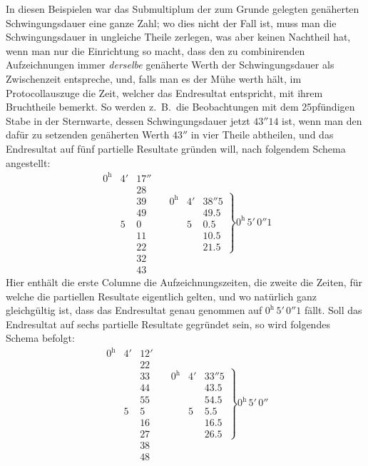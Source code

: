 In diesen Beispielen war das Submultiplum der zum Grunde gelegten genäherten Schwingungsdauer eine ganze Zahl; wo dies nicht der Fall ist, muss man die Schwingungsdauer in ungleiche Theile zerlegen, was aber keinen Nachtheil hat, wenn man nur die Einrichtung so macht, dass den zu combinirenden Aufzeichnungen immer \textit{derselbe} genäherte Werth der Schwingungsdauer als Zwischenzeit entspreche, und, falls man es der Mühe werth hält, im Protocollauszuge die Zeit, welcher das Endresultat entspricht, mit ihrem Bruchtheile bemerkt. So werden z.\ B.\ die Beobachtungen mit dem 25pfündigen Stabe in der Sternwarte, dessen Schwingungsdauer jetzt $43''14$ ist, wenn man den dafür zu setzenden genäherten Werth $43''$ in vier Theile abtheilen, und das Endresultat auf fünf partielle Resultate gründen will, nach folgendem Schema angestellt:
\[
\begin{array}{rrr|}
0^{\mathrm h}&4'&17''\\
&&28\\
&&39\\
&&49\\
&5&0\\
&&11\\
&&22\\
&&32\\
&&43
\end{array}\quad
\left.\begin{array}{rrr}0^{\mathrm h}&4'&38''5\\&&49.5\\&5&0.5\\&&10.5\\&&21.5\end{array}\right\}0^{\mathrm h}\,5'\,0''1
\]
Hier enthält die erste Columne die Aufzeichnungszeiten, die zweite die Zeiten, für welche die partiellen Resultate eigentlich gelten, und wo natürlich
ganz gleichgültig ist, dass das Endresultat genau genommen auf $0^{\mathrm h}\,5'\,0''1$ fällt. Soll das Endresultat auf sechs partielle Resultate gegründet sein, so wird folgendes Schema befolgt:
\[
\begin{array}{rrr|}
0^{\mathrm h}&4'&12'\\
&&22\\
&&33\\
&&44\\
&&55\\
&5&5\\
&&16\\
&&27\\
&&38\\
&&48
\end{array}\quad
\left.\begin{array}{rrr}0^{\mathrm h}&4'&33''5\\&&43.5\\&&54.5\\&5&5.5\\&&16.5\\&&26.5\end{array}\right\}0^{\mathrm h}\,5'\,0''
\]

